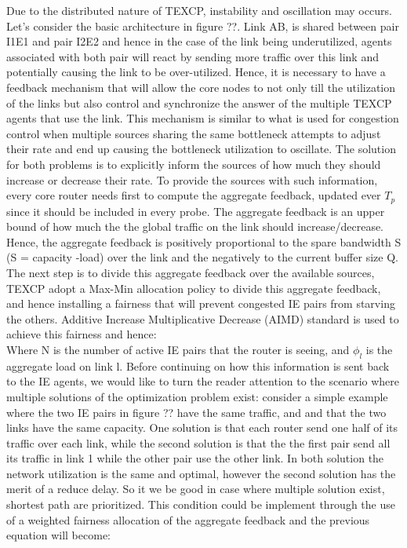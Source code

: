 Due to the distributed nature of TEXCP, instability and oscillation may occurs. Let's consider the basic architecture in figure ??.  Link AB, is shared between pair I1E1 and pair I2E2 and hence in the case of the link being underutilized, agents associated with both pair will react by sending more traffic over this link and potentially causing the link to be over-utilized. Hence, it is necessary to have a feedback mechanism that will allow the core nodes to not only till  the utilization of the links but also control and synchronize the answer of the multiple TEXCP agents that use the link. This mechanism is similar to what is used for congestion control when multiple sources sharing the same bottleneck attempts to adjust their rate and end up causing the bottleneck utilization to oscillate. The solution for both problems is to explicitly inform the sources of how much they should increase or decrease their rate. To provide the sources with such information, every core router needs first to compute the aggregate feedback, updated ever $T_p$ since it should be included in every probe. The aggregate feedback is an upper bound of how much the the global traffic on the link should increase/decrease. Hence, the aggregate feedback is positively proportional to the spare bandwidth S (S = capacity -load) over the link and the negatively to the current buffer size Q.
\begin {equation}
\end {equation}
The next step is to divide this aggregate feedback over the available sources, TEXCP adopt a Max-Min allocation policy to divide this aggregate feedback, and hence installing a fairness that will prevent congested IE pairs from starving the others. Additive Increase Multiplicative Decrease (AIMD) standard is used to achieve this fairness and hence: 
\begin {equation}
\end {equation}
Where N is the number of active IE pairs that the router is seeing, and $\phi_l$ is the aggregate load on link l.
Before continuing on how this information is sent back to the IE agents, we would like to turn the reader attention to the scenario where multiple solutions of the optimization problem exist: consider a simple example where the two IE pairs in figure ?? have the same traffic, and and that the two links have the same capacity. One solution is that each router send one half of its traffic over each link, while the second solution is that the the first pair send all its traffic in link 1 while the other pair use the other link. In both solution the network utilization is the same and optimal, however the second solution has the merit of  a reduce delay. So it we be good in case where multiple solution exist, shortest path are prioritized. This condition could be implement through the use of a weighted fairness allocation of the aggregate feedback and the previous equation will become: 
